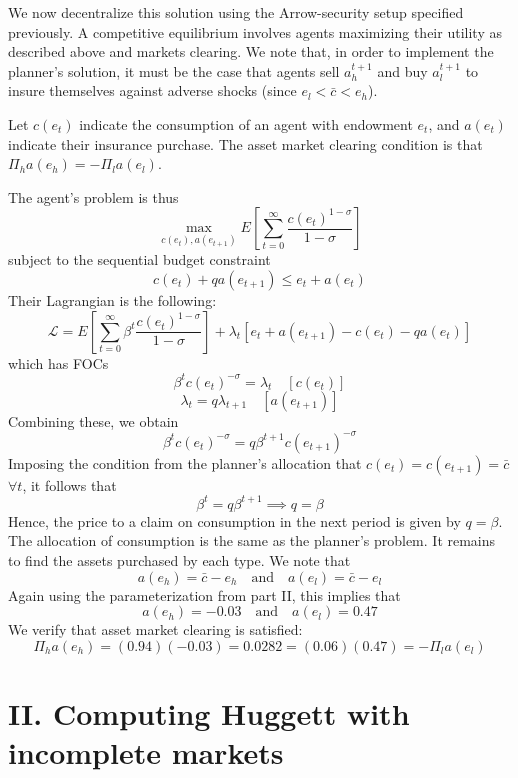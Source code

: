 \documentclass[12pt]{article}
\begin{document}
We now decentralize this solution using the Arrow-security setup specified previously. A competitive equilibrium involves agents maximizing their utility as described above and markets clearing. We note that, in order to implement the planner's solution, it must be the case that agents sell $a_h^{t+1}$ and buy $a_l^{t+1}$ to insure themselves against adverse shocks (since $e_l < \bar{c} < e_h$).

Let $c(e_t)$ indicate the consumption of an agent with endowment $e_t$, and $a(e_t)$ indicate their insurance purchase. The asset market clearing condition is that $\Pi_h a(e_h) = -\Pi_l a(e_l)$.

The agent's problem is thus
\[\max_{c(e_t), a(e_{t+1})} E\left[ \sum_{t=0}^{\infty} \frac{c(e_t)^{1-\sigma}}{1-\sigma}\right]\]
subject to the sequential budget constraint
\[c(e_t) + q a(e_{t+1}) \leq e_t + a(e_t)\]
Their Lagrangian is the following:
\[\mathcal{L} = E\left[\sum_{t=0}^{\infty} \beta^t\frac{c(e_t)^{1-\sigma}}{1-\sigma}\right] + \lambda_t [ e_t + a(e_{t+1}) - c(e_t) - q a(e_t)]\]
which has FOCs
\[\beta^t c(e_t)^{-\sigma} =\lambda_t \quad [c(e_t)]\]
\[\lambda_t = q \lambda_{t+1} \quad [a(e_{t+1})]\]
Combining these, we obtain
\[\beta^t c(e_t)^{-\sigma} = q \beta^{t+1} c(e_{t+1})^{-\sigma}\]
Imposing the condition from the planner's allocation that $c(e_t) = c(e_{t+1}) = \bar{c}$ $\forall t$, it follows that
\[\beta^t = q \beta^{t+1} \implies q = \beta\]
Hence, the price to a claim on consumption in the next period is given by $q= \beta$. The allocation of consumption is the same as the planner's problem. It remains to find the assets purchased by each type. We note that
\[a(e_h) = \bar{c} - e_h \quad \text{and} \quad a(e_l) = \bar{c} - e_l\]
Again using the parameterization from part II, this implies that
\[a(e_h) = -0.03 \quad \text{and} \quad a(e_l) = 0.47\]
We verify that asset market clearing is satisfied:
\[\Pi_h a(e_h) =(0.94) (-0.03) = 0.0282 = (0.06)(0.47) = -\Pi_l a(e_l) \]
\section{II. Computing Huggett with incomplete markets} 
\end{document}
